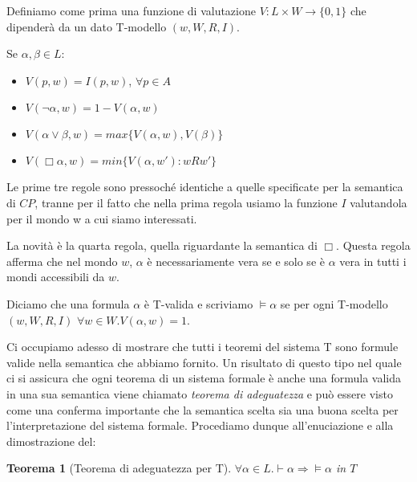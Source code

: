 \documentclass[a4paper, titlepage, 12pt]{report}
\newtheorem{theorem}{Teorema}[chapter]
\begin{document}
Definiamo come prima una funzione di valutazione $V : L \times W \to \{0, 1\}$ che dipenderà da un dato T-modello
$(w, W, R, I)$.

Se $\alpha, \beta \in L$:
\begin{itemize}
\item $V(p, w) = I(p, w)$, $\forall p \in A$
\item $V(\neg \alpha, w) = 1 - V(\alpha, w)$
\item $V(\alpha \vee \beta, w) = max\{V(\alpha, w), V(\beta)\}$
\item $V(\Box \alpha, w) = min\{ V(\alpha, w') : w R w' \}$
\end{itemize}

Le prime tre regole sono pressoché identiche a quelle specificate per la semantica di $CP$,
tranne per il fatto che nella prima regola usiamo la funzione $I$ valutandola per il mondo w
a cui siamo interessati.

La novità è la quarta regola, quella riguardante la semantica di $\Box$.
Questa regola afferma che nel mondo $w$, $\alpha$ è necessariamente vera se e solo se
è $\alpha$ vera in tutti i mondi accessibili da $w$.

Diciamo che una formula $\alpha$ è T-valida e scriviamo $\vDash \alpha$
se per ogni T-modello $(w, W, R, I)$ $\forall w \in W. V(\alpha, w) = 1$.

Ci occupiamo adesso di mostrare che tutti i teoremi del sistema T sono formule valide
nella semantica che abbiamo fornito. Un risultato di questo tipo nel quale
ci si assicura che ogni teorema di un sistema formale è anche una formula
valida in una sua semantica viene chiamato
\emph{teorema di adeguatezza} e può essere visto come una conferma
importante che la semantica scelta sia una buona scelta per l'interpretazione
del sistema formale.
Procediamo dunque all'enuciazione e alla dimostrazione del:

\begin{theorem}[Teorema di adeguatezza per T]
$\forall \alpha \in L. \vdash \alpha \Rightarrow \vDash \alpha$ in $T$
\end{theorem}
\end{document}
